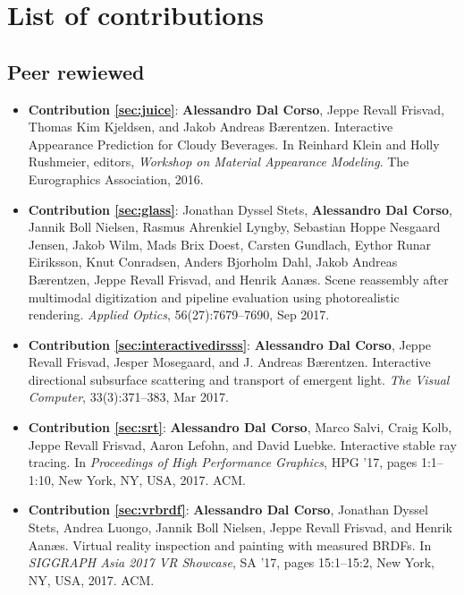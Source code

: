 \chapter*{List of contributions}
\label{sec:contributionlist}
\section*{Peer rewiewed}
\begin{itemize}
\item \textbf{Contribution \ref{sec:juice}}: \textbf{Alessandro Dal Corso}, Jeppe Revall Frisvad, Thomas Kim Kjeldsen, and Jakob Andreas Bærentzen. Interactive Appearance Prediction for Cloudy Beverages. In Reinhard Klein and Holly Rushmeier, editors, \textit{Workshop on Material Appearance Modeling}. The Eurographics Association, 2016.~\cite{dalcorsomam16}
\item \textbf{Contribution \ref{sec:glass}}: Jonathan Dyssel Stets, \textbf{Alessandro Dal Corso}, Jannik Boll Nielsen, Rasmus Ahrenkiel Lyngby, Sebastian Hoppe Nesgaard Jensen, Jakob Wilm, Mads Brix Doest, Carsten Gundlach, Eythor Runar Eiriksson, Knut Conradsen, Anders Bjorholm Dahl, Jakob Andreas Bærentzen, Jeppe Revall Frisvad, and Henrik Aanæs. Scene reassembly after multimodal digitization and pipeline evaluation using photorealistic rendering. \textit{Applied Optics}, 56(27):7679–7690, Sep 2017.~\cite{stets17}
\item \textbf{Contribution \ref{sec:interactivedirsss}}: \textbf{Alessandro Dal Corso}, Jeppe Revall Frisvad, Jesper Mosegaard, and J. Andreas Bærentzen. Interactive directional subsurface scattering and transport of emergent light. \textit{The Visual Computer}, 33(3):371–383, Mar 2017.~\cite{dalcorso17dirsss}
\item \textbf{Contribution \ref{sec:srt}}: \textbf{Alessandro Dal Corso}, Marco Salvi, Craig Kolb, Jeppe Revall Frisvad, Aaron Lefohn, and David Luebke. Interactive stable ray tracing. In \textit{Proceedings of High Performance Graphics}, HPG ’17, pages 1:1–1:10, New York, NY, USA, 2017. ACM. \cite{dalcorso17hpg}
\item \textbf{Contribution \ref{sec:vrbrdf}}: \textbf{Alessandro Dal Corso}, Jonathan Dyssel Stets, Andrea Luongo, Jannik Boll Nielsen, Jeppe Revall Frisvad, and Henrik Aanæs. Virtual reality inspection and painting with measured BRDFs. In \textit{SIGGRAPH Asia 2017 VR Showcase}, SA ’17, pages 15:1–15:2, New York, NY, USA, 2017. ACM.~\cite{dalcorso17vr}
\end{itemize}


